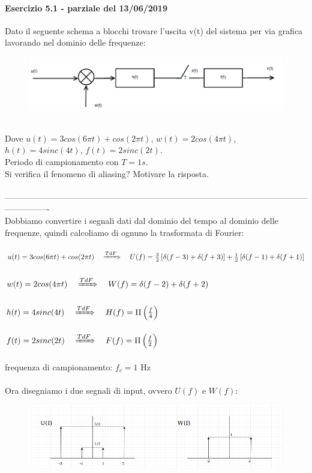 \documentclass[12pt,a4paper]{article}
\begin{document}
	\paragraph{Esercizio 5.1 - parziale del 13/06/2019} Dato il seguente schema a blocchi trovare l’uscita v(t) del sistema per via grafica lavorando nel dominio delle frequenze:
	\begin{figure}[h!]
		\centering
		\includegraphics[scale=0.4]{./images/fourier51.png}
	\end{figure}
	\\Dove $u(t) = 3cos(6\pi t) + cos(2\pi t)$, $w(t) = 2cos(4\pi t)$, $h(t) = 4sinc(4t)$, $f(t) = 2sinc(2t)$.\\
	Periodo di campionamento con $T= 1s$. \\Si verifica il fenomeno di aliasing?  Motivare la risposta.\\ \\
	----------------------------------------------------------------------------------------------------------------------------\\
	Dobbiamo convertire i segnali dati dal dominio del tempo al dominio delle frequenze, quindi calcoliamo di ognuno la trasformata di Fourier:\\\\
	$u(t) = 3cos(6\pi t) + cos(2\pi t)\quad\xRightarrow[]{TdF}\quad U(f) = \frac{3}{2}\left[\delta(f-3) + \delta(f+3)\right] + \frac{1}{2}\left[\delta(f-1) + \delta(f+1)\right]$\\\\
	$w(t) = 2cos(4\pi t)\quad\xRightarrow[]{TdF}\quad W(f) = \delta(f-2) + \delta(f+2)$\\\\
	$h(t) = 4sinc(4t)\quad\xRightarrow[]{TdF}\quad H(f) = \Pi\left(\frac{f}{4}\right)$\\\\
	$f(t) = 2sinc(2t)\quad\xRightarrow[]{TdF}\quad F(f) = \Pi\left(\frac{f}{2}\right)$\\\\
	frequenza di campionamento: $f_c = 1$ Hz\\\\
	Ora disegniamo i due segnali di input, ovvero $U(f)$ e $W(f)$:
	\begin{figure}[h!]
		\centering
		\includegraphics[scale=0.6]{./images/fourier52.png}
	\end{figure}
\end{document}
